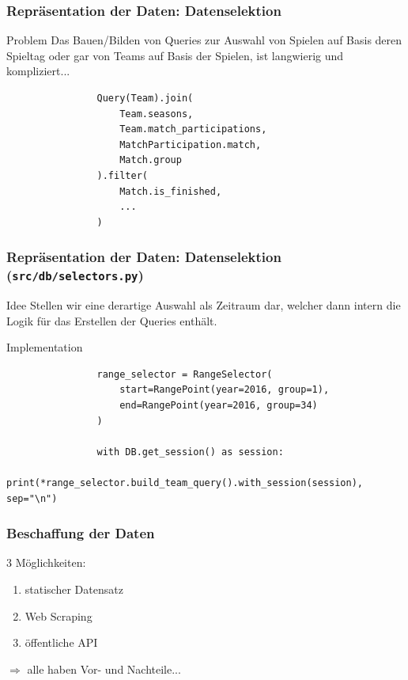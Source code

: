 \documentclass{beamer}
\begin{document}
    \begin{frame}[fragile]
        \frametitle{Repräsentation der Daten: Datenselektion}
        \begin{alertblock}{Problem}
            Das Bauen/Bilden von Queries zur Auswahl von Spielen auf Basis deren Spieltag oder gar von Teams auf Basis der Spielen, ist langwierig und kompliziert...
            \begin{verbatim}
                Query(Team).join(
                    Team.seasons,
                    Team.match_participations,
                    MatchParticipation.match,
                    Match.group
                ).filter(
                    Match.is_finished,
                    ...
                )
            \end{verbatim}
        \end{alertblock}
    \end{frame}
    \begin{frame}[fragile]
        \frametitle{Repräsentation der Daten: Datenselektion \tiny{(\texttt{src/db/selectors.py})}}
        \begin{block}{Idee}
            Stellen wir eine derartige Auswahl als Zeitraum dar, welcher dann intern die Logik für das Erstellen der Queries enthält.
        \end{block}
        \begin{exampleblock}{Implementation}
            \begin{verbatim}
                range_selector = RangeSelector(
                    start=RangePoint(year=2016, group=1),
                    end=RangePoint(year=2016, group=34)
                )

                with DB.get_session() as session:
                    print(*range_selector.build_team_query().with_session(session), sep="\n")
            \end{verbatim}
        \end{exampleblock}
    \end{frame}
    \begin{frame}
        \frametitle{Beschaffung der Daten}
        3 Möglichkeiten:
        \begin{enumerate}
            \item statischer Datensatz
            \item Web Scraping
            \item öffentliche API
        \end{enumerate}
        $\Rightarrow$ alle haben Vor- und Nachteile...
    \end{frame}
\end{document}
